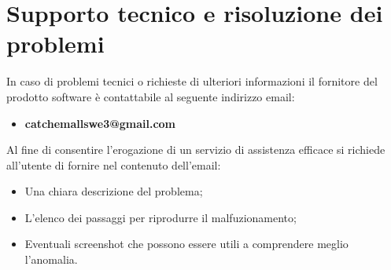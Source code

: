 \section{Supporto tecnico e risoluzione dei problemi}
In caso di problemi tecnici o richieste di ulteriori informazioni il fornitore del prodotto software è contattabile al seguente indirizzo email:
\begin{itemize}
	\item  \textbf{catchemallswe3@gmail.com} 
 \end{itemize}
 Al fine di consentire l'erogazione di un servizio di assistenza efficace si richiede all'utente di fornire nel contenuto dell'email:
\begin{itemize}
	\item Una chiara descrizione del problema;
	\item L'elenco dei passaggi per riprodurre il malfuzionamento;
    \item Eventuali screenshot che possono essere utili a comprendere meglio l'anomalia.
\end{itemize}  
